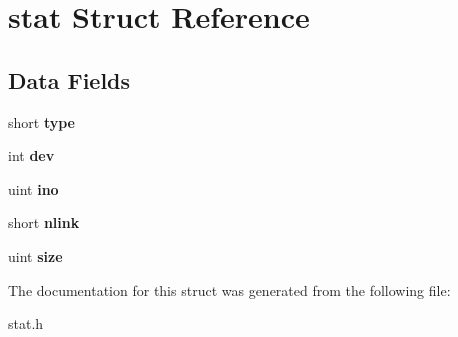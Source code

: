 \hypertarget{structstat}{}\section{stat Struct Reference}
\label{structstat}
\subsection*{Data Fields}
\begin{DoxyCompactItemize}
\item 
short {\bfseries type}\hypertarget{structstat_a01f1b4cd7627d192a7875c9a188e0699}{}\label{structstat_a01f1b4cd7627d192a7875c9a188e0699}

\item 
int {\bfseries dev}\hypertarget{structstat_a14ef4f85e6fb86bf296360361d0f393b}{}\label{structstat_a14ef4f85e6fb86bf296360361d0f393b}

\item 
uint {\bfseries ino}\hypertarget{structstat_abf15624517ed5d79d0fa2a5553a68e25}{}\label{structstat_abf15624517ed5d79d0fa2a5553a68e25}

\item 
short {\bfseries nlink}\hypertarget{structstat_a99ca3487fd2f4799337eb4281f8871e4}{}\label{structstat_a99ca3487fd2f4799337eb4281f8871e4}

\item 
uint {\bfseries size}\hypertarget{structstat_a4ac15b64dd4d787c59a8a687d79adb35}{}\label{structstat_a4ac15b64dd4d787c59a8a687d79adb35}

\end{DoxyCompactItemize}


The documentation for this struct was generated from the following file\+:\begin{DoxyCompactItemize}
\item 
stat.\+h\end{DoxyCompactItemize}
